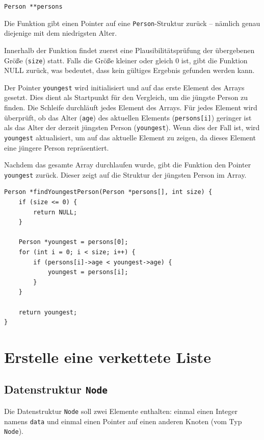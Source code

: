 \texttt{Person **persons}

Die Funktion gibt einen Pointer auf eine \texttt{Person}-Struktur zurück
-- nämlich genau diejenige mit dem niedrigsten Alter.

Innerhalb der Funktion findet zuerst eine Plausibilitätsprüfung der übergebenen
Größe (\texttt{size}) statt. Falls die Größe kleiner oder gleich 0 ist,
gibt die Funktion NULL zurück, was bedeutet, dass kein gültiges Ergebnis
gefunden werden kann.

Der Pointer \texttt{youngest} wird initialisiert und auf das erste
Element des Arrays gesetzt. Dies dient als Startpunkt für den Vergleich, um die
jüngste Person zu finden. Die Schleife durchläuft jedes Element des Arrays. Für
jedes Element wird überprüft, ob das Alter (\texttt{age}) des aktuellen
Elements (\texttt{persons[i]}) geringer ist als das Alter der derzeit
jüngsten Person (\texttt{youngest}). Wenn dies der Fall ist, wird
\texttt{youngest} aktualisiert, um auf das aktuelle Element zu zeigen, da
dieses Element eine jüngere Person repräsentiert.

Nachdem das gesamte Array durchlaufen wurde, gibt die Funktion den Pointer
\texttt{youngest} zurück. Dieser zeigt auf die Struktur der jüngsten
Person im Array.

\begin{verbatim}
Person *findYoungestPerson(Person *persons[], int size) {
    if (size <= 0) {
        return NULL;
    }

    Person *youngest = persons[0];
    for (int i = 0; i < size; i++) {
        if (persons[i]->age < youngest->age) {
            youngest = persons[i];
        }
    }

    return youngest;
}
\end{verbatim}





\chapter{Erstelle eine verkettete Liste}

\section*{Datenstruktur \texttt{Node}}

Die Datenstruktur \texttt{Node} soll zwei Elemente enthalten: einmal
einen Integer namens \texttt{data} und einmal einen Pointer auf einen
anderen Knoten (vom Typ \texttt{Node}).

